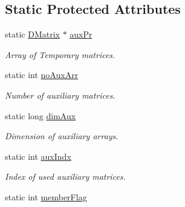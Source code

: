 \subsection*{Static Protected Attributes}
\begin{DoxyCompactItemize}
\item 
\hypertarget{classDMatrix_a8e0787660169ccbbbe03abfe35cfa2bb}{
static \hyperlink{classDMatrix}{DMatrix} $\ast$ \hyperlink{classDMatrix_a8e0787660169ccbbbe03abfe35cfa2bb}{auxPr}}
\label{classDMatrix_a8e0787660169ccbbbe03abfe35cfa2bb}

\begin{DoxyCompactList}\small\item\em Array of Temporary matrices. \item\end{DoxyCompactList}\item 
\hypertarget{classDMatrix_a56775df03984b80a3d42399b7ab76fce}{
static int \hyperlink{classDMatrix_a56775df03984b80a3d42399b7ab76fce}{noAuxArr}}
\label{classDMatrix_a56775df03984b80a3d42399b7ab76fce}

\begin{DoxyCompactList}\small\item\em Number of auxiliary matrices. \item\end{DoxyCompactList}\item 
\hypertarget{classDMatrix_a5bb25eb7096e0e1e23a3d8060f022604}{
static long \hyperlink{classDMatrix_a5bb25eb7096e0e1e23a3d8060f022604}{dimAux}}
\label{classDMatrix_a5bb25eb7096e0e1e23a3d8060f022604}

\begin{DoxyCompactList}\small\item\em Dimension of auxiliary arrays. \item\end{DoxyCompactList}\item 
\hypertarget{classDMatrix_a4751f59f6b2d9ca38bc86861356daacb}{
static int \hyperlink{classDMatrix_a4751f59f6b2d9ca38bc86861356daacb}{auxIndx}}
\label{classDMatrix_a4751f59f6b2d9ca38bc86861356daacb}

\begin{DoxyCompactList}\small\item\em Index of used auxiliary matrices. \item\end{DoxyCompactList}\item 
\hypertarget{classDMatrix_a5ea72e70cde471344b0cb5fa4a5c2652}{
static int \hyperlink{classDMatrix_a5ea72e70cde471344b0cb5fa4a5c2652}{memberFlag}}
\label{classDMatrix_a5ea72e70cde471344b0cb5fa4a5c2652}


\end{DoxyCompactItemize}

